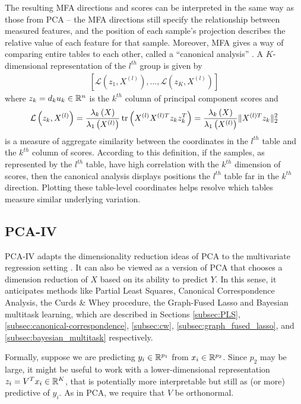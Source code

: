\documentclass[14pt]{extarticle}
\begin{document}
The resulting MFA directions and scores can be interpreted in the same
way as those from PCA -- the MFA directions still specify the
relationship between measured features, and the position of each
sample's projection describes the relative value of each feature for
that sample. Moreover, MFA gives a way of comparing entire tables to
each other, called a ``canonical analysis'' \citep{pages2004multiple}. A
$K$-dimensional representation of the $l^{th}$ group is given by
\begin{align*}
\left[\mathcal{L}\left(z_{1}, X^{(l)}\right), \dots,
  \mathcal{L}\left(z_{K}, X^{(l)}\right)\right]
\end{align*}
where $z_{k} = d_{k}u_{k} \in \mathbb{R}^{n}$ is the $k^{th}$ column of principal
component scores and
\begin{align*}
  \mathcal{L}\left(z_{k}, X^{(l)}\right) =
  \frac{\lambda_{k}\left(X\right)}{\lambda_{1}\left(X^{(l)}\right)}\mathop\mathrm{tr}\left(X^{(l)}X^{(l)
      T} z_{k}z_{k}^{T}\right) =
  \frac{\lambda_{k}\left(X\right)}{\lambda_{1}\left(X^{(l)}\right)}\|X^{(l)
  T} z_{k}\|^{2}_{2}
\end{align*}
is a measure of aggregate similarity between the coordinates in the $l^{th}$
table and the $k^{th}$ column of scores. According to this definition, if the
samples, as represented by the $l^{th}$ table, have high correlation with the
$k^{th}$ dimension of scores, then the canonical analysis displays positions the
$l^{th}$ table far in the $k^{th}$ direction. Plotting these table-level
coordinates helps resolve which tables measure similar underlying variation.

\subsection{PCA-IV}

PCA-IV adapts the dimensionality reduction ideas of PCA to the multivariate
regression setting \citep{rao1964use}. It can also be viewed as a version of PCA
that chooses a dimension reduction of $X$ based on its ability to predict $Y$.
In this sense, it anticipates methods like Partial Least Squares, Canonical
Correspondence Analysis, the Curds \& Whey procedure, the Graph-Fused Lasso and
Bayesian multitask learning, which are described in Sections \ref{subsec:PLS},
\ref{subsec:canonical-correspondence}, \ref{subsec:cw},
\ref{subsec:graph_fused_lasso}, and \ref{subsec:bayesian_multitask}
respectively.

Formally, suppose we are predicting $y_{i} \in \mathbb{R}^{p_{1}}$ from $x_{i} \in
\mathbb{R}^{p_{2}}$. Since $p_{2}$ may be large, it might be useful to work with a
lower-dimensional representation $z_{i} = V^{T}x_{i} \in \mathbb{R}^{K}$, that is
potentially more interpretable but still as (or more) predictive of $y_{i}$. As
in PCA, we require that $V$ be orthonormal.
\end{document}
